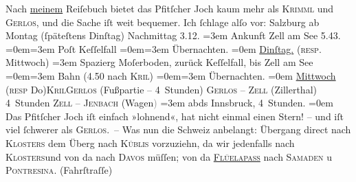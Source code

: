 \begin{ledgroupsized}[t]{13cm}
           \pstart
           Nach \uline{meinem} Reiſebuch bietet das Pfitſcher Joch kaum mehr als \textsc{Krimml} und \textsc{Gerlos}, und die Sache iſt weit bequemer.\pend
           \pstart
           Ich ſchlage alſo vor:\pend
           \pstart
           Salzburg ab Montag (ſpäteſtens
                  Dinſtag) Nachmittag 3.12.\pend
           \leftskip=3em{}\pstart
           \noindent{}{\pb}Ankunft Zell am See{ }5.43.\pend
           \leftskip=0em{}\leftskip=3em{}\pstart
           Poſt Keſſelfall\pend
           \leftskip=0em{}\leftskip=3em{}\pstart
           Übernachten.\pend
           \leftskip=0em{}\pstart
           \noindent{}\uline{Dinſtag.} (\textsc{resp}. Mittwoch)\pend
           \leftskip=3em{}\pstart
           \noindent{}Spazierg Moſerboden, zurück Keſſelfall, bis Zell am See\pend
           \leftskip=0em{}\leftskip=3em{}\pstart
           Bahn (4.50 nach \textsc{Kri{\geminationm}l})\pend
           \leftskip=0em{}\leftskip=3em{}\pstart
           Übernachten.\pend
           \leftskip=0em{}\pstart
           \noindent{}\uline{Mittwoch}{ }\introOben{}(\textsc{resp}{ }Do{\geminationn})\introOben{}{ }\textsc{Kri{\geminationm}l}\textsc{Gerlos} (Fußpartie – 4 Stunden)\pend
           \pstart
           \textsc{Gerlos} – \textsc{Zell} (Zillerthal) 4 Stunden\pend
           \pstart
           \textsc{Zell – Jenbach} (Wagen\textcolor{gray}{)}\pend
           \leftskip=3em{}\pstart
           \noindent{}abds{ }Innsbruck, 4 Stunden.\pend
           \leftskip=0em{}\pstart
           \noindent{}{\pb}Das Pfitſcher
                  Joch iſt einfach »lohnend«, hat nicht einmal einen Stern! – und iſt
               viel ſchwerer als \textsc{Gerlos}. –\pend
           \pstart
           Was nun die Schweiz anbelangt: Übergang direct
               nach \textsc{Klosters} dem Überg nach \textsc{Küblis} vorzuziehn, da wir jedenfalls nach \textsc{Klosters}und von da nach \textsc{Davos} müſſen; von da \textsc{\uline{Flüelapass}} nach \textsc{Samaden} u \textsc{Pontresina}. (Fahrſtraſſe)\pend

\end{ledgroupsized}
